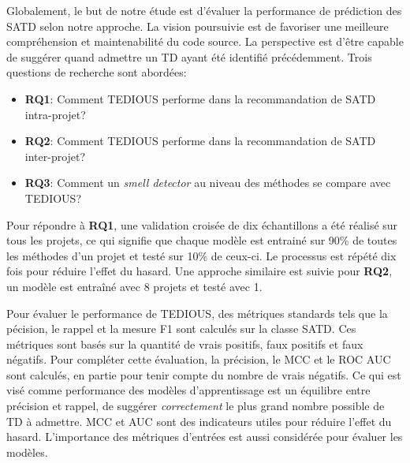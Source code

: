 Globalement, le but de notre \'{e}tude est d'\'{e}valuer la performance de pr\'{e}diction des \ac{SATD} selon notre approche. La vision poursuivie est de favoriser une meilleure compr\'{e}hension et maintenabilit\'{e} du code source. La perspective est d'\^{e}tre capable de sugg\'{e}rer quand admettre un \ac{TD} ayant \'{e}t\'{e} identifi\'{e} pr\'{e}c\'{e}demment. Trois questions de recherche sont abord\'{e}es: \par

\begin{itemize}
	\item \textbf{RQ1}: Comment \ac{TEDIOUS} performe dans la recommandation de \ac{SATD} intra-projet? 
	\item \textbf{RQ2}: Comment \ac{TEDIOUS} performe dans la recommandation de \ac{SATD}  inter-projet?
	\item \textbf{RQ3}: Comment un \emph{smell detector} au niveau des m\'{e}thodes se compare avec \ac{TEDIOUS}?
\end{itemize}


Pour r\'{e}pondre \`{a} \textbf{RQ1}, une validation crois\'{e}e de dix \'{e}chantillons a \'{e}t\'{e} r\'{e}alis\'{e} sur tous les projets, ce qui signifie que chaque mod\`{e}le est entrain\'{e} sur 90\% de toutes les m\'{e}thodes d'un projet et test\'{e} sur 10\% de ceux-ci.  Le processus est r\'{e}p\'{e}t\'{e} dix fois pour r\'{e}duire l'effet du hasard. Une approche similaire est suivie pour \textbf{RQ2}, un mod\`{e}le est entra\^{i}n\'{e} avec 8 projets et test\'{e} avec 1. \par

Pour \'{e}valuer le performance de \ac{TEDIOUS}, des m\'{e}triques standards tels que la p\'{e}cision, le rappel et la mesure F1 sont calcul\'{e}s sur la classe \ac{SATD}. Ces m\'{e}triques sont bas\'{e}s sur la quantit\'{e} de vrais positifs, faux positifs et faux n\'{e}gatifs. Pour compl\'{e}ter cette \'{e}valuation, la pr\'{e}cision, le \ac{MCC} et le \ac{ROC} \ac{AUC} sont calcul\'{e}s, en partie pour tenir compte du nombre de vrais n\'{e}gatifs. Ce qui est vis\'{e} comme performance des mod\`{e}les d'apprentissage est un \'{e}quilibre entre pr\'{e}cision et rappel, de sugg\'{e}rer \emph{correctement} le plus grand nombre possible de \ac{TD} \`{a} admettre. \ac{MCC} et \ac{AUC} sont des indicateurs  utiles pour r\'{e}duire l'effet du hasard. L'importance des m\'{e}triques d'entr\'{e}es est aussi consid\'{e}r\'{e}e pour \'{e}valuer les mod\`{e}les. \par


